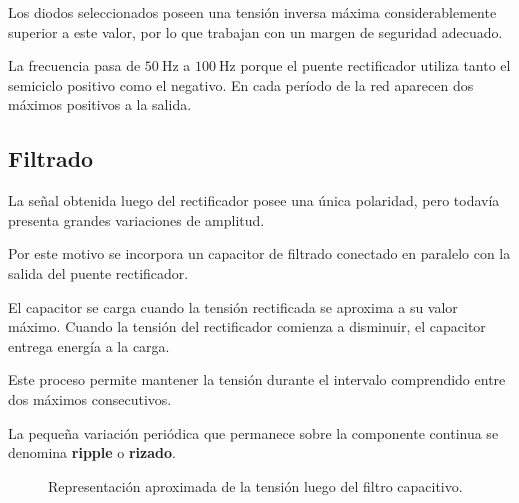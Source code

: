 \documentclass[12pt,a4paper]{article}
\begin{document}
	Los diodos seleccionados poseen una tensión inversa máxima considerablemente
	superior a este valor, por lo que trabajan con un margen de seguridad adecuado.
	
	\begin{tcolorbox}[
		colback=gray!5,
		colframe=black!50,
		title=Punto importante
		]
		La frecuencia pasa de $50~\text{Hz}$ a $100~\text{Hz}$ porque el puente
		rectificador utiliza tanto el semiciclo positivo como el negativo. En cada
		período de la red aparecen dos máximos positivos a la salida.
	\end{tcolorbox}
	
	\subsection{Filtrado}
	
	La señal obtenida luego del rectificador posee una única polaridad, pero todavía
	presenta grandes variaciones de amplitud.
	
	Por este motivo se incorpora un capacitor de filtrado conectado en paralelo con
	la salida del puente rectificador.
	
	El capacitor se carga cuando la tensión rectificada se aproxima a su valor máximo.
	Cuando la tensión del rectificador comienza a disminuir, el capacitor entrega
	energía a la carga.
	
	Este proceso permite mantener la tensión durante el intervalo comprendido entre
	dos máximos consecutivos.
	
	La pequeña variación periódica que permanece sobre la componente continua se
	denomina \textbf{ripple} o \textbf{rizado}.
	
	\begin{figure}[H]
		\centering
		
		
		\caption{Representación aproximada de la tensión luego del filtro
			capacitivo.}
		\label{fig:ripple}
		
	\end{figure}
	
\end{document}
